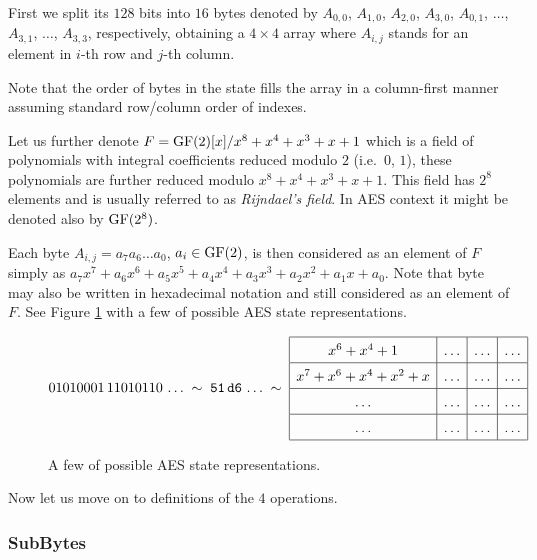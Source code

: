 First we split its $128$ bits into $16$ bytes denoted by $A_{0,0}$, $A_{1,0}$, $A_{2,0}$, $A_{3,0}$, $A_{0,1}$, $\ldots$, $A_{3,1}$, $\ldots$, $A_{3,3}$, respectively, obtaining a $4\times 4$ array where $A_{i,j}$ stands for an element in $i$-th row and $j$-th column.

\begin{remark}
\label{rem:aesstate}
	Note that the order of bytes in the state fills the array in a column-first manner assuming standard row/column order of indexes.
\end{remark}

Let us further denote $F = \mathrm{GF}(2)[x]/x^8+x^4+x^3+x+1$ which is a field of polynomials with integral coefficients reduced modulo $2$ (i.e.\ $0$, $1$), these polynomials are further reduced modulo $x^8+x^4+x^3+x+1$. This field has $2^8$ elements and is usually referred to as {\em Rijndael's field}. In AES context it might be denoted also by $\mathrm{GF}(2^8)$.


Each byte $A_{i,j} = a_7a_6\ldots a_0$, $a_i\in\mathrm{GF}(2)$, is then considered as an element of $F$ simply as $a_7x^7 + a_6x^6 + a_5x^5 + a_4x^4 + a_3x^3 + a_2x^2 + a_1x + a_0$.  Note that byte may also be written in hexadecimal notation and still considered as an element of $F$. See Figure \ref{fig:aesnot} with a few of possible AES state representations.

\begin{figure}[H]
\[
\arraycolsep=.5em\def\arraystretch{1.5}
	01010001\,11010110\,\ldots\;\sim\;\texttt{51}\,\texttt{d6}\,\ldots\;\sim\;
	\begin{array}{|c|c|c|c|}
		\hline
		x^6 + x^4 + 1 & \ldots & \ldots & \ldots \\
		\hline
		x^7 + x^6 + x^4 + x^2 + x & \ldots & \ldots & \ldots \\
		\hline
		\ldots & \ldots & \ldots & \ldots \\
		\hline
		\ldots & \ldots & \ldots & \ldots \\
		\hline
	\end{array}
\]
\caption{A few of possible AES state representations.}
\label{fig:aesnot}
\end{figure}

\noindent
Now let us move on to definitions of the $4$ operations.

\subsubsection{SubBytes}
	
